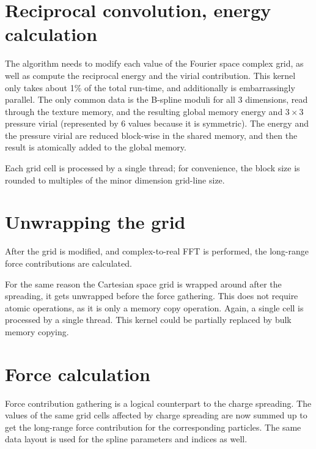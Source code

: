 \documentclass[12pt,a4paper]{report}
\newcommand{\draft}[1]{#1}
\begin{document}
\section{Reciprocal convolution, energy calculation}


The algorithm needs to modify each value of the Fourier space complex grid, as well as compute the reciprocal energy and the virial contribution. This kernel only takes about \draft{1\%} of the total run-time, and additionally is embarrassingly parallel. The only common data is the B-spline moduli for all 3 dimensions, read through the texture memory, and the resulting global memory energy and $3 \times 3$ pressure virial (represented by 6 values because it is symmetric). The energy and the pressure virial are reduced block-wise in the shared memory, and then the result is atomically added to the global memory.

Each grid cell is processed by a single thread; for convenience, the block size is rounded to multiples of the minor dimension grid-line size. 

\section{Unwrapping the grid}
After the grid is modified, and complex-to-real FFT is performed, the long-range force contributions are calculated.

For the same reason the Cartesian space grid is wrapped around after the spreading, it gets unwrapped before the force gathering. This does not require atomic operations, as it is only a memory copy operation. Again, a single cell is processed by a single thread. This kernel could be partially replaced by bulk memory copying. 

\section{Force calculation}
Force contribution gathering is a logical counterpart to the charge spreading. The values of the same grid cells affected by charge spreading are now summed up to get the long-range force contribution for the corresponding particles.
The same data layout is used for the spline parameters and indices as well.

\end{document}
